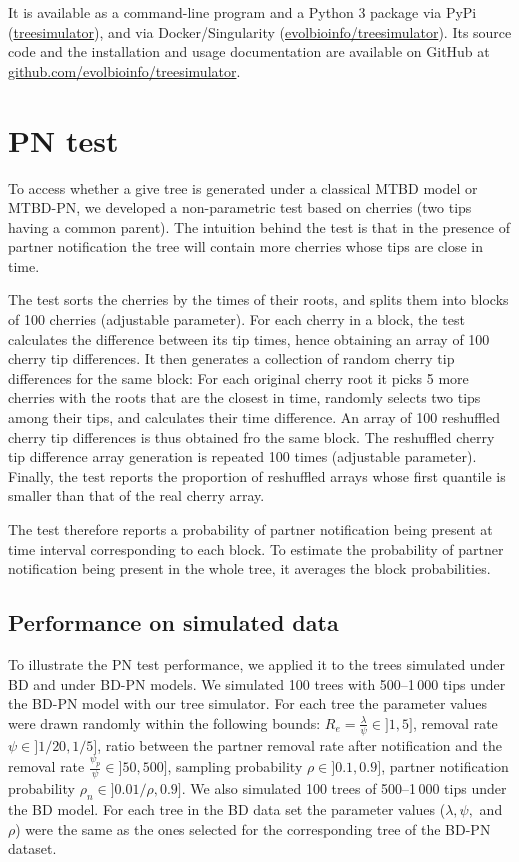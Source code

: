 \documentclass[a4paper,10pt]{article}
\begin{document}
It is available as a command-line program and a Python 3 package via PyPi (\href{https://pypi.org/project/treesimulator}{treesimulator}), and via Docker/Singularity (\href{https://hub.docker.com/r/evolbioinfo/treesimulator/tags}{evolbioinfo/treesimulator}). Its source code and the installation and usage documentation are available on GitHub at \href{https://github.com/evolbioinfo/treesimulator}{github.com/evolbioinfo/treesimulator}.


\section{PN test}
To access whether a give tree is generated under a classical MTBD model or MTBD-PN, we developed a non-parametric test based on cherries (two tips having a common parent). 
The intuition behind the test is that in the presence of partner notification the tree will contain more cherries whose tips are close in time. 

The test sorts the cherries by the times of their roots, and splits them into blocks of 100 cherries (adjustable parameter). For each cherry in a block, the test calculates the difference between its tip times, hence obtaining an array of 100 cherry tip differences. It then generates a collection of random cherry tip differences for the same block: For each original cherry root it picks 5 more cherries with the roots that are the closest in time, randomly selects two tips among their tips, and calculates their time difference. An array of 100 reshuffled cherry tip differences is thus obtained fro the same block. The reshuffled cherry tip difference array generation is repeated 100 times (adjustable parameter). Finally, the test reports the proportion of reshuffled arrays whose first quantile is smaller than that of the real cherry array. 

The test therefore reports a probability of partner notification being present at time interval corresponding to each block. To estimate the probability of partner notification being present in the whole tree, it averages the block probabilities. 


\subsection{Performance on simulated data}
To illustrate the PN test performance, we applied it to the trees simulated under BD and under BD-PN models. We simulated 100 trees with 500--1\,000 tips under the BD-PN model with our tree simulator. For each tree the parameter values were drawn randomly within the following bounds:
$R_e = \frac{{\lambda}}{{\psi}} \in ]1, 5]$, 
removal rate $\psi \in ]1 / 20, 1 / 5]$,
ratio between the partner removal rate after notification and the removal rate $\frac{\psi_p}{\psi} \in ]50, 500]$,
sampling probability $\rho \in ]0.1, 0.9]$,
partner notification probability $\rho_n \in ]0.01/\rho, 0.9]$. We also simulated 100 trees of 500--1\,000 tips under the BD model. For each tree in the BD data set the parameter values ($\lambda, \psi,$ and $\rho$) were the same as the ones selected for the corresponding tree of the BD-PN dataset.
\end{document}
